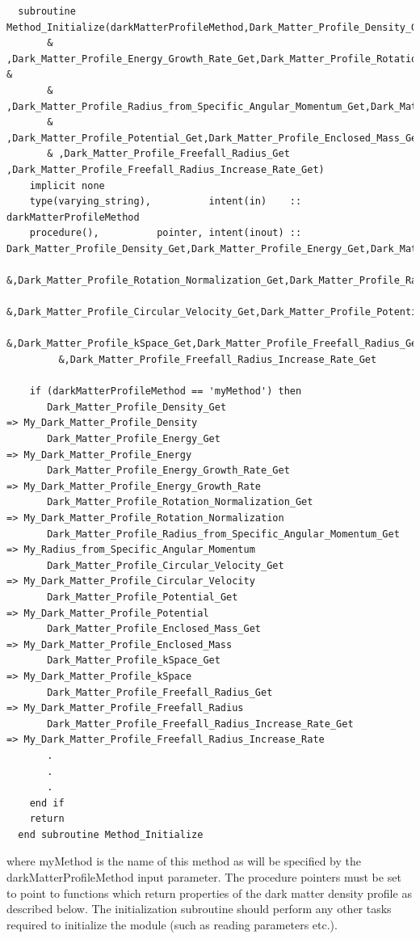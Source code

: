 \begin{verbatim}
  subroutine Method_Initialize(darkMatterProfileMethod,Dark_Matter_Profile_Density_Get,Dark_Matter_Profile_Energy_Get&
       & ,Dark_Matter_Profile_Energy_Growth_Rate_Get,Dark_Matter_Profile_Rotation_Normalization_Get &
       & ,Dark_Matter_Profile_Radius_from_Specific_Angular_Momentum_Get,Dark_Matter_Profile_Circular_Velocity_Get&
       & ,Dark_Matter_Profile_Potential_Get,Dark_Matter_Profile_Enclosed_Mass_Get,Dark_Matter_Profile_kSpace_Get&
       & ,Dark_Matter_Profile_Freefall_Radius_Get ,Dark_Matter_Profile_Freefall_Radius_Increase_Rate_Get)
    implicit none
    type(varying_string),          intent(in)    :: darkMatterProfileMethod
    procedure(),          pointer, intent(inout) :: Dark_Matter_Profile_Density_Get,Dark_Matter_Profile_Energy_Get,Dark_Matter_Profile_Energy_Growth_Rate_Get&
         &,Dark_Matter_Profile_Rotation_Normalization_Get,Dark_Matter_Profile_Radius_from_Specific_Angular_Momentum_Get&
         &,Dark_Matter_Profile_Circular_Velocity_Get,Dark_Matter_Profile_Potential_Get,Dark_Matter_Profile_Enclosed_Mass_Get&
         &,Dark_Matter_Profile_kSpace_Get,Dark_Matter_Profile_Freefall_Radius_Get&
         &,Dark_Matter_Profile_Freefall_Radius_Increase_Rate_Get

    if (darkMatterProfileMethod == 'myMethod') then
       Dark_Matter_Profile_Density_Get                               => My_Dark_Matter_Profile_Density
       Dark_Matter_Profile_Energy_Get                                => My_Dark_Matter_Profile_Energy
       Dark_Matter_Profile_Energy_Growth_Rate_Get                    => My_Dark_Matter_Profile_Energy_Growth_Rate
       Dark_Matter_Profile_Rotation_Normalization_Get                => My_Dark_Matter_Profile_Rotation_Normalization
       Dark_Matter_Profile_Radius_from_Specific_Angular_Momentum_Get => My_Radius_from_Specific_Angular_Momentum
       Dark_Matter_Profile_Circular_Velocity_Get                     => My_Dark_Matter_Profile_Circular_Velocity
       Dark_Matter_Profile_Potential_Get                             => My_Dark_Matter_Profile_Potential
       Dark_Matter_Profile_Enclosed_Mass_Get                         => My_Dark_Matter_Profile_Enclosed_Mass
       Dark_Matter_Profile_kSpace_Get                                => My_Dark_Matter_Profile_kSpace
       Dark_Matter_Profile_Freefall_Radius_Get                       => My_Dark_Matter_Profile_Freefall_Radius
       Dark_Matter_Profile_Freefall_Radius_Increase_Rate_Get         => My_Dark_Matter_Profile_Freefall_Radius_Increase_Rate
       .
       .
       .
    end if
    return
  end subroutine Method_Initialize
\end{verbatim}
where {\normalfont \ttfamily myMethod} is the name of this method as will be specified by the {\normalfont \ttfamily darkMatterProfileMethod} input parameter. The procedure pointers must be set to point to functions which return properties of the dark matter density profile as described below. The initialization subroutine should perform any other tasks required to initialize the module (such as reading parameters etc.).

